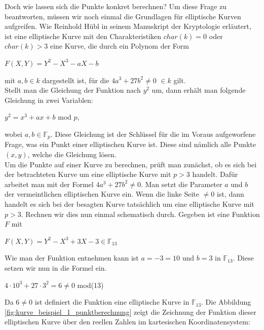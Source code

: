 Doch wie lassen sich die Punkte konkret berechnen? Um diese Frage zu beantworten, müssen wir noch einmal die Grundlagen für elliptische Kurven aufgreifen. Wie Reinhold Hübl in seinem Manuskript der Kryptologie \cite[S. 157]{Dr.ReinholdHubl.2022} erläutert, ist eine elliptische Kurve mit den Charakteristiken $char(k) = 0$ oder $char(k) > 3$ eine Kurve, die durch ein Polynom der Form
\begin{center}
$F(X, Y) = Y^{2} - X^{3} - aX - b$
\end{center} 

mit $a, b \in k$ dargestellt ist, für die $4a^3 + 27b^2 \neq 0$  $\in k$ gilt.\\

Stellt man die Gleichung der Funktion nach $y^{2}$ um, dann erhält man folgende Gleichung in zwei Variablen:
\begin{center}
$y^{2} =  x^{3} + ax + b  \text{ mod } p$,
\end{center}

wobei $a, b \in \mathbb{F}_p$. Diese Gleichung ist der Schlüssel für die im Voraus aufgeworfene Frage, was ein Punkt einer elliptischen Kurve ist. Diese sind nämlich alle Punkte $(x, y)$, welche die Gleichung lösen.\\

Um die Punkte auf einer Kurve zu berechnen, prüft man zunächst, ob es sich bei der betrachteten Kurve um eine elliptische Kurve mit $p > 3$ handelt. Dafür arbeitet man mit der Formel  $4a^3 + 27b^2 \neq 0$. Man setzt die Parameter $a$ und $b$ der vermeintlichen elliptischen Kurve ein. Wenn die linke Seite $\neq 0$ ist, dann handelt es sich bei der besagten Kurve tatsächlich um eine elliptische Kurve mit $p > 3$. Rechnen wir dies nun einmal schematisch durch. Gegeben ist eine Funktion $F$ mit
\begin{center}
$F(X, Y) = Y^{2} - X^{3} + 3X - 3 \in \mathbb{F}_{13}$
\end{center} 

Wie man der Funktion entnehmen kann ist $a = - 3 = 10$ und $b = 3$ in $\mathbb{F}_{13}$. Diese setzen wir nun in die Formel ein.
\begin{center}
$4 \cdot 10^3 + 27 \cdot 3^2 = 6 \neq 0$ mod(13)
\end{center} 

Da $6 \neq 0$ ist definiert die Funktion eine elliptische Kurve in $\mathbb{F}_{13}$. Die Abbildung \ref{fig:kurve_beispiel_1_punktberechnung} zeigt die Zeichnung der Funktion dieser elliptischen Kurve über den reellen Zahlen im kartesischen Koordinatensystem: 

